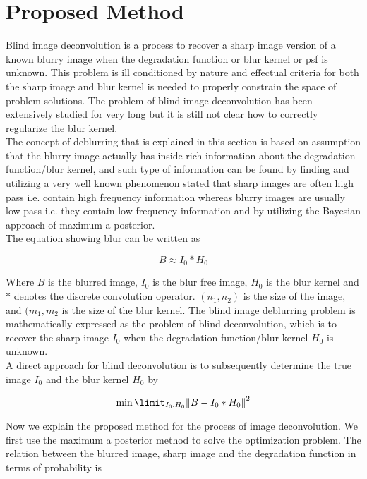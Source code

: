 \documentclass{article}
\begin{document}
\clearpage
\section{Proposed Method}
Blind image deconvolution is a process to recover a sharp image version of a known blurry image when the degradation function or blur kernel or psf is unknown. This problem is ill conditioned by nature and effectual criteria for both the sharp image and blur kernel is needed to properly constrain the space of problem solutions. The problem of blind image deconvolution has been extensively studied for very long but it is still not clear how to correctly regularize the blur kernel. \\

The concept of deblurring that is explained in this section is based on assumption that the blurry image actually has inside rich information about the degradation function/blur kernel, and such type of information can be found by finding and utilizing a very well known phenomenon stated that sharp images are often high pass i.e. contain high frequency information whereas blurry images are usually low pass i.e. they contain low frequency information and by utilizing the Bayesian approach of maximum a posterior.  \\

The equation showing blur can be written as

\begin{equation}
    B \approx I_0 * H_0
\end{equation}

Where $B$ is the blurred image, $I_0$ is the blur free image, $H_0$ is the blur kernel and $*$ denotes the discrete convolution operator. $(n_1, n_2)$ is the size of the image, and $(m_1, m_2$ is the size of the blur kernel. The blind image deblurring problem is mathematically expressed as the problem of blind deconvolution, which is to recover the sharp image $I_0$ when the degradation function/blur kernel $H_0$ is unknown. \\

A direct approach for blind deconvolution is to subsequently determine the true image $I_0$ and the blur kernel $H_0$ by

\begin{equation}
    \min\limit_{I_0, H_0} \norm{B - I_0 * H_0}^2
\end{equation}

Now we explain the proposed method for the process of image deconvolution. We first use the maximum a posterior method to solve the optimization problem. The relation between the blurred image, sharp image and the degradation function in terms of probability is 
\end{document}
